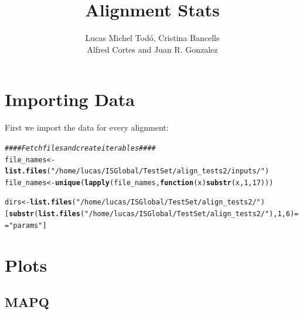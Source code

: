 \documentclass[12pt, a4paper]{article}\usepackage[]{graphicx}\usepackage[]{color}
\title{\textbf{\Large Alignment Stats}}
\author {Lucas Michel Todó, Cristina Bancells\\
Alfred Cortes and Juan R. Gonzalez}
\affil{Barcelona Global Health Institute (ISGlobal), Campus PRBB}
\makeatletter
\newcommand{\hlnum}[1]{\textcolor[rgb]{0.686,0.059,0.569}{#1}}%
\newcommand{\hlstr}[1]{\textcolor[rgb]{0.192,0.494,0.8}{#1}}%
\newcommand{\hlcom}[1]{\textcolor[rgb]{0.678,0.584,0.686}{\textit{#1}}}%
\newcommand{\hlopt}[1]{\textcolor[rgb]{0,0,0}{#1}}%
\newcommand{\hlstd}[1]{\textcolor[rgb]{0.345,0.345,0.345}{#1}}%
\newcommand{\hlkwa}[1]{\textcolor[rgb]{0.161,0.373,0.58}{\textbf{#1}}}%
\newcommand{\hlkwb}[1]{\textcolor[rgb]{0.69,0.353,0.396}{#1}}%
\newcommand{\hlkwc}[1]{\textcolor[rgb]{0.333,0.667,0.333}{#1}}%
\newcommand{\hlkwd}[1]{\textcolor[rgb]{0.737,0.353,0.396}{\textbf{#1}}}%
\newenvironment{kframe}{%
 \def\at@end@of@kframe{}%
 \ifinner\ifhmode%
  \def\at@end@of@kframe{\end{minipage}}%
  \begin{minipage}{\columnwidth}%
 \fi\fi%
 \def\FrameCommand##1{\hskip\@totalleftmargin \hskip-\fboxsep
 \colorbox{shadecolor}{##1}\hskip-\fboxsep
     \hskip-\linewidth \hskip-\@totalleftmargin \hskip\columnwidth}%
 \MakeFramed {\advance\hsize-\width
   \@totalleftmargin\z@ \linewidth\hsize
   \@setminipage}}%
 {\par\unskip\endMakeFramed%
 \at@end@of@kframe}
\newenvironment{knitrout}{}{} %
\makeatother
\begin{document}
	
\maketitle
\tableofcontents
\newpage



\section{Importing Data}

First we import the data for every alignment:
\begin{knitrout}
\color{fgcolor}\begin{kframe}
\begin{alltt}
\hlcom{####  Fetch files and create iterables ####}
\hlstd{file_names} \hlkwb{<-} \hlkwd{list.files}\hlstd{(}\hlstr{"/home/lucas/ISGlobal/TestSet/align_tests2/inputs/"}\hlstd{)}
\hlstd{file_names} \hlkwb{<-} \hlkwd{unique}\hlstd{(}\hlkwd{lapply}\hlstd{(file_names,} \hlkwa{function}\hlstd{(}\hlkwc{x}\hlstd{)} \hlkwd{substr}\hlstd{(x,}\hlnum{1}\hlstd{,}\hlnum{17}\hlstd{)))}

\hlstd{dirs} \hlkwb{<-} \hlkwd{list.files}\hlstd{(}\hlstr{"/home/lucas/ISGlobal/TestSet/align_tests2/"}\hlstd{)[}\hlkwd{substr}\hlstd{(}\hlkwd{list.files}\hlstd{(}\hlstr{"/home/lucas/ISGlobal/TestSet/align_tests2/"}\hlstd{),}\hlnum{1}\hlstd{,}\hlnum{6}\hlstd{)} \hlopt{==} \hlstr{"params"}\hlstd{]}
\end{alltt}
\end{kframe}
\end{knitrout}

\clearpage
\section{Plots}
\subsection{MAPQ}
\end{document}
